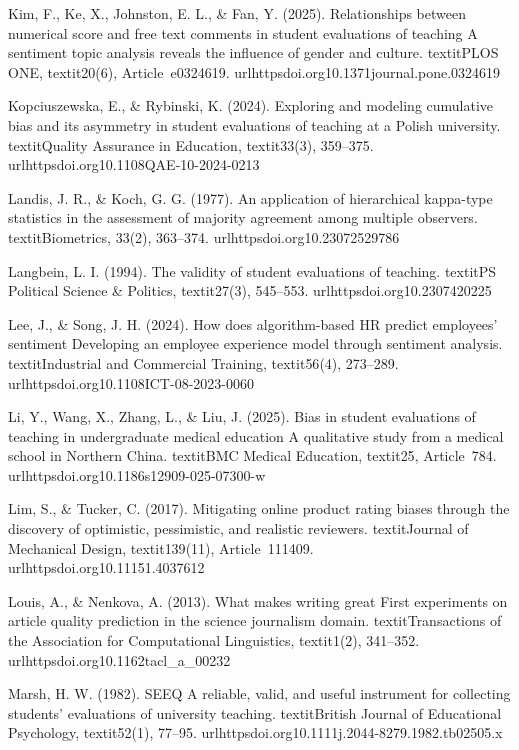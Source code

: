 Kim, F., Ke, X., Johnston, E. L., & Fan, Y. (2025). Relationships between numerical score and free text comments in student evaluations of teaching A sentiment topic analysis reveals the influence of gender and culture. textit{PLOS ONE}, textit{20}(6), Article~e0324619. url{httpsdoi.org10.1371journal.pone.0324619}

Kopciuszewska, E., & Rybinski, K. (2024). Exploring and modeling cumulative bias and its asymmetry in student evaluations of teaching at a Polish university. textit{Quality Assurance in Education}, textit{33}(3), 359--375. url{httpsdoi.org10.1108QAE-10-2024-0213}

Landis, J. R., & Koch, G. G. (1977). An application of hierarchical kappa-type statistics in the assessment of majority agreement among multiple observers. textit{Biometrics, 33}(2), 363--374. url{httpsdoi.org10.23072529786}

Langbein, L. I. (1994). The validity of student evaluations of teaching. textit{PS Political Science & Politics}, textit{27}(3), 545--553. url{httpsdoi.org10.2307420225}

Lee, J., & Song, J. H. (2024). How does algorithm-based HR predict employees’ sentiment Developing an employee experience model through sentiment analysis. textit{Industrial and Commercial Training}, textit{56}(4), 273--289. url{httpsdoi.org10.1108ICT-08-2023-0060}

Li, Y., Wang, X., Zhang, L., & Liu, J. (2025). Bias in student evaluations of teaching in undergraduate medical education A qualitative study from a medical school in Northern China. textit{BMC Medical Education}, textit{25}, Article~784. url{httpsdoi.org10.1186s12909-025-07300-w}

Lim, S., & Tucker, C. (2017). Mitigating online product rating biases through the discovery of optimistic, pessimistic, and realistic reviewers. textit{Journal of Mechanical Design}, textit{139}(11), Article~111409. url{httpsdoi.org10.11151.4037612}

Louis, A., & Nenkova, A. (2013). What makes writing great First experiments on article quality prediction in the science journalism domain. textit{Transactions of the Association for Computational Linguistics}, textit{1}(2), 341--352. url{httpsdoi.org10.1162tacl_a_00232}

Marsh, H. W. (1982). SEEQ A reliable, valid, and useful instrument for collecting students' evaluations of university teaching. textit{British Journal of Educational Psychology}, textit{52}(1), 77--95. url{httpsdoi.org10.1111j.2044-8279.1982.tb02505.x}

